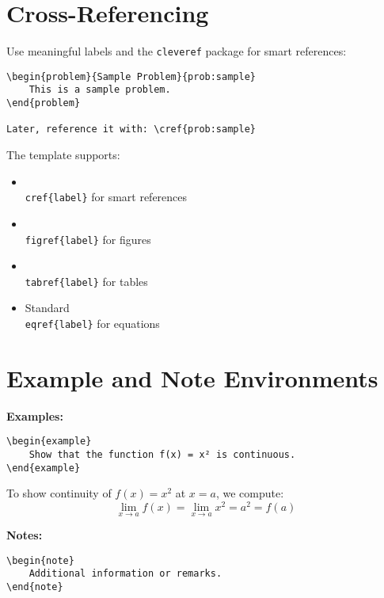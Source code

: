 \documentclass[11pt, oneside, openany]{book}
\theoremstyle{definition}
\newcommand{\figref}[1]{Figure~\ref{#1}}
\newcommand{\tabref}[1]{Table~\ref{#1}}
\begin{document}
\section*{Cross-Referencing}

Use meaningful labels and the \texttt{cleveref} package for smart references:

\begin{verbatim}
\begin{problem}{Sample Problem}{prob:sample}
    This is a sample problem.
\end{problem}

Later, reference it with: \cref{prob:sample}
\end{verbatim}

The template supports:
\begin{itemize}
    \item \texttt{\\cref\{label\}} for smart references
    \item \texttt{\\figref\{label\}} for figures
    \item \texttt{\\tabref\{label\}} for tables
    \item Standard \texttt{\\eqref\{label\}} for equations
\end{itemize}

\section*{Example and Note Environments}

\textbf{Examples:}
\begin{verbatim}
\begin{example}
    Show that the function f(x) = x² is continuous.
\end{example}
\end{verbatim}

\begin{example}
    To show continuity of $f(x) = x^2$ at $x = a$, we compute:
    $$\lim_{x \to a} f(x) = \lim_{x \to a} x^2 = a^2 = f(a)$$
\end{example}

\textbf{Notes:}
\begin{verbatim}
\begin{note}
    Additional information or remarks.
\end{note}
\end{verbatim}
\end{document}
